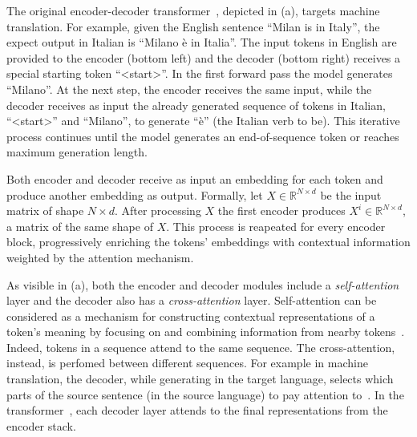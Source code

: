 The original encoder-decoder transformer~\cite{vaswani_transformers_2017}, depicted in (a), targets machine translation. For example, given the English sentence ``Milan is in Italy'', the expect output in Italian is ``Milano è in Italia''. 
The input tokens in English are provided to the encoder (bottom left) and the decoder (bottom right) receives a special starting token ``<start>''. In the first forward pass the model generates ``Milano''. At the next step, the encoder receives the same input, while the decoder receives as input the already generated sequence of tokens in Italian, ``<start>'' and ``Milano'', to generate ``è'' (the Italian verb to be). This iterative process continues until the model generates an end-of-sequence token or reaches maximum generation length.


Both encoder and decoder receive as input an embedding for each token and produce another embedding as output. Formally, let $X \in \mathbb{R}^{N \times d}$ be the input matrix of shape $N \times d$. After processing $X$ the first encoder produces $X^i \in \mathbb{R}^{N \times d}$, a matrix of the same shape of $X$. This process is reapeated for every encoder block, progressively enriching the tokens' embeddings with contextual information weighted by the attention mechanism. 

As visible in (a), both the encoder and decoder modules include a \emph{self-attention} layer and the decoder also has a \emph{cross-attention} layer.
Self-attention can be considered as a mechanism for constructing contextual representations of a token's meaning by focusing on and combining information from nearby tokens~\cite{jm3}. Indeed, tokens in a sequence attend to the same sequence.
The cross-attention, instead, is perfomed between different sequences. For example in machine translation, the decoder, while generating in the target language, selects which parts of the source sentence (in the source language) to pay attention to~\cite{bahdanau2015neural}. In the transformer~\cite{vaswani_transformers_2017}, each decoder layer attends to the final representations from the encoder stack.

